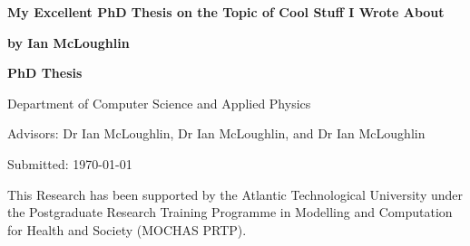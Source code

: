 
\newcommand{\thesistitle}{My Excellent PhD Thesis on the Topic of Cool Stuff I Wrote About}
\newcommand{\thesisauthor}{by Ian McLoughlin}
\newcommand{\thesisadvisor}{Advisors: Dr Ian McLoughlin, Dr Ian McLoughlin, and Dr Ian McLoughlin}
\newcommand{\thesistype}{PhD Thesis}
\newcommand{\thesisdate}{Submitted: \today}
\newcommand{\thesisdepartment}{Department of Computer Science and Applied Physics}
\newcommand{\thesisfunding}{This Research has been supported by the Atlantic Technological University under the Postgraduate Research Training Programme in Modelling and Computation for Health and Society (MOCHAS PRTP).}

\begin{titlingpage}
  
  {\noindent\Huge\textbf{\thesistitle}\par}
  \vspace{12mm}
  {\noindent\LARGE\textbf{\thesisauthor}\par}
  \vspace{26mm}
  {\noindent\Large\textbf{\thesistype}\par}
  \vspace{4mm}
  {\noindent\Large\thesisdepartment\par}
  \vspace{4mm}
  {\noindent\Large\thesisadvisor\par}
  \vspace{4mm}
  {\noindent\Large\thesisdate\par}
  \vspace{26mm}
  {\noindent\thesisfunding\par}


  
\end{titlingpage}